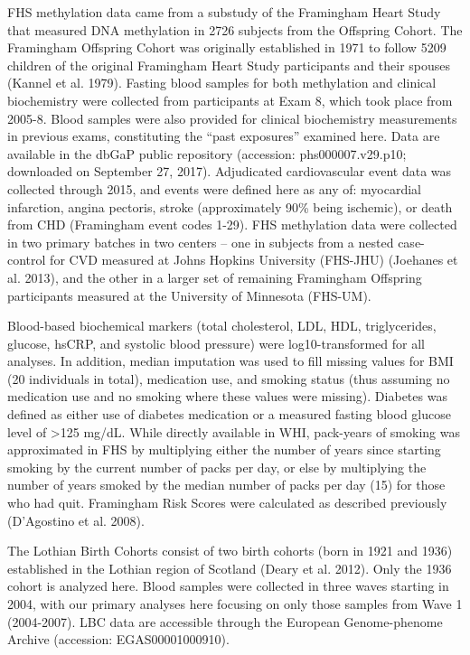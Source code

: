 \documentclass[]{article}
\begin{document}
FHS methylation data came from a substudy of the Framingham Heart Study
that measured DNA methylation in 2726 subjects from the Offspring
Cohort. The Framingham Offspring Cohort was originally established in
1971 to follow 5209 children of the original Framingham Heart Study
participants and their spouses (Kannel et al. 1979). Fasting blood
samples for both methylation and clinical biochemistry were collected
from participants at Exam 8, which took place from 2005-8. Blood samples
were also provided for clinical biochemistry measurements in previous
exams, constituting the ``past exposures'' examined here. Data are
available in the dbGaP public repository (accession: phs000007.v29.p10;
downloaded on September 27, 2017). Adjudicated cardiovascular event data
was collected through 2015, and events were defined here as any of:
myocardial infarction, angina pectoris, stroke (approximately 90\% being
ischemic), or death from CHD (Framingham event codes 1-29). FHS
methylation data were collected in two primary batches in two centers --
one in subjects from a nested case-control for CVD measured at Johns
Hopkins University (FHS-JHU) (Joehanes et al. 2013), and the other in a
larger set of remaining Framingham Offspring participants measured at
the University of Minnesota (FHS-UM).

Blood-based biochemical markers (total cholesterol, LDL, HDL,
triglycerides, glucose, hsCRP, and systolic blood pressure) were
log10-transformed for all analyses. In addition, median imputation was
used to fill missing values for BMI (20 individuals in total),
medication use, and smoking status (thus assuming no medication use and
no smoking where these values were missing). Diabetes was defined as
either use of diabetes medication or a measured fasting blood glucose
level of \textgreater{}125 mg/dL. While directly available in WHI,
pack-years of smoking was approximated in FHS by multiplying either the
number of years since starting smoking by the current number of packs
per day, or else by multiplying the number of years smoked by the median
number of packs per day (15) for those who had quit. Framingham Risk
Scores were calculated as described previously (D'Agostino et al. 2008).

The Lothian Birth Cohorts consist of two birth cohorts (born in 1921 and
1936) established in the Lothian region of Scotland (Deary et al. 2012).
Only the 1936 cohort is analyzed here. Blood samples were collected in
three waves starting in 2004, with our primary analyses here focusing on
only those samples from Wave 1 (2004-2007). LBC data are accessible
through the European Genome-phenome Archive (accession:
EGAS00001000910).
\end{document}
